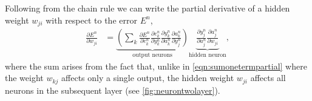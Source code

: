 \documentclass[thesis]{subfiles}
\begin{document}
Following from the chain rule we can write the partial derivative of a hidden weight $w_{ji}$ with respect to the error $E^n$,
\begin{equation}
\begin{aligned}
    \frac{\partial E^n}{\partial w_{ji}} &= \underbrace{\left( \sum_k \frac{\partial E^n}{\partial e^n_{k}}
     \frac{\partial e^n_{k}}{\partial y^n_{k}} \frac{\partial y^n_{k}}{\partial a^n_k} \frac{\partial a^n_k}{\partial y^n_{j}}\right)}_\text{output neurons}
     \underbrace{\frac{\partial y^n_{j}}{\partial a^n_{j}} \frac{\partial a^n_{j}}{\partial w_{ji}}}_\text{hidden neuron},
     \label{eqn:twolayer1}
\end{aligned}
\end{equation}
%
where the sum arises from the fact that, unlike in \cref{eqn:sumonetermpartial} where the weight $w_{kj}$ affects only a single output, the hidden weight $w_{ji}$ affects all neurons in the subsequent layer (see \cref{fig:neurontwolayer}).
\end{document}
